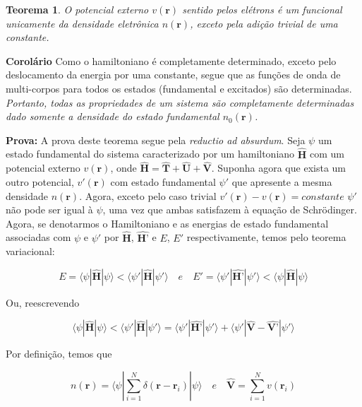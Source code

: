 		\newtheorem{DFT}{Teorema}[chapter]
		\begin{DFT}
			\label{teohk1}
			O potencial externo $v(\textbf{r})$ sentido pelos elétrons é um funcional unicamente da densidade eletrônica $n(\textbf{r})$, exceto pela adição trivial de uma constante.
		\end{DFT}
		\textbf{Corolário} Como o hamiltoniano é completamente determinado, exceto pelo deslocamento da energia por uma constante, segue que as funções de onda de multi-corpos para todos os estados (fundamental e excitados) são determinadas. \textit{Portanto, todas as propriedades de um sistema são completamente determinadas dado somente a densidade do estado fundamental $n_0(\textbf{r})$.}
		
		\textbf{Prova:} A prova deste teorema segue pela \textit{reductio ad absurdum}. Seja $\psi$ um estado fundamental do sistema caracterizado por um hamiltoniano $\hat{\textbf{H}}$ com um potencial externo $v(\textbf{r})$, onde  $ \hat{\textbf{H}}= \hat{\textbf{T}} + \hat{\textbf{U}} + \hat{\textbf{V}}$. Suponha agora que exista um outro potencial, $v'(\textbf{r})$ com estado fundamental $\psi'$ que apresente a mesma densidade $n(\textbf{r})$. Agora, exceto pelo caso trivial $v'(\textbf{r}) - v(\textbf{r}) = constante$ $\psi'$ não pode ser igual à $\psi$, uma vez que ambas satisfazem à equação de Schrödinger. Agora, se denotarmos o Hamiltoniano e as energias de estado fundamental associadas com $\psi$ e $\psi'$ por $\hat{\textbf{H}}$, $\hat{\textbf{H'}}$ e $E$, $E'$ respectivamente, temos pelo teorema variacional:
		
		\begin{equation}
			E = \langle \psi | \hat{\textbf{H}} | \psi \rangle < \langle \psi' | \hat{\textbf{H}} | \psi' \rangle \quad e \quad
			E' = \langle \psi' | \hat{\textbf{H'}} | \psi' \rangle < \langle \psi | \hat{\textbf{H}} | \psi \rangle 
		\end{equation}
		
		Ou, reescrevendo
		
		\begin{equation}
			\langle \psi | \hat{\textbf{H}} | \psi \rangle < \langle \psi' | \hat{\textbf{H}} | \psi' \rangle = \langle \psi' | \hat{\textbf{H'}} | \psi' \rangle + \langle \psi' | \hat{\textbf{V}} - \hat{\textbf{V'}} | \psi' \rangle
			\label{teo1}
		\end{equation}
		
		Por definição, temos que
		
		\begin{equation}
			n(\textbf{r}) = \langle \psi | \sum_{i=1}^{N} \delta(\textbf{r} - \textbf{r}_i)|\psi \rangle \quad e \quad \hat{\textbf{V}} = \sum_{i=1}^{N} v(\textbf{r}_i)
		\end{equation}
		
